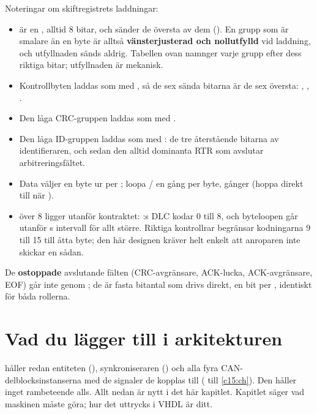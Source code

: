 Noteringar om skiftregistrets laddningar:
\begin{itemize}
  \item {} är en , alltid 8 bitar, och sänder de översta
     av dem (). En grupp som är smalare än en byte är alltså
    \textbf{vänsterjusterad och nollutfylld} vid laddning, och utfyllnaden sänds aldrig. Tabellen
    ovan namnger varje grupp efter dess riktiga bitar; utfyllnaden är mekanisk.
  \item Kontrollbyten laddas som  med , så de sex
    sända bitarna är de sex översta: , , .
  \item Den låga CRC-gruppen laddas som  med .
  \item Den låga ID-gruppen laddas som  med
    : de tre återstående bitarna av identifieraren, och sedan den alltid
    dominanta RTR som avslutar arbitreringsfältet.
  \item Data väljer en byte ur  per ; loopa
    / en gång per byte,  gånger (hoppa direkt till
     när ).
  \item {} över 8 ligger utanför kontraktet: :s DLC kodar 0
    till 8, och byteloopen går utanför s intervall för allt större. Riktiga
    kontrollrar begränsar kodningarna 9 till 15 till åtta byte; den här designen kräver helt enkelt
    att anroparen inte skickar en sådan.
\end{itemize}

De \textbf{ostoppade} avslutande fälten (CRC-avgränsare, ACK-lucka, ACK-avgränsare, EOF) går inte
genom ; de är fasta bitantal som drivs direkt, en bit per
, identiskt för båda rollerna.

\section{Vad du lägger till i arkitekturen}
\label{c16:sec:declare}

 håller redan entiteten (), synkroniseraren
 () och alla fyra CAN-delblocksinstanserna med de signaler de kopplas
till ( till \ref{c15:ch}). Den håller inget rambeteende alls. Allt nedan är nytt i
det här kapitlet. Kapitlet säger vad maskinen måste göra; hur det uttrycks i VHDL är ditt.

